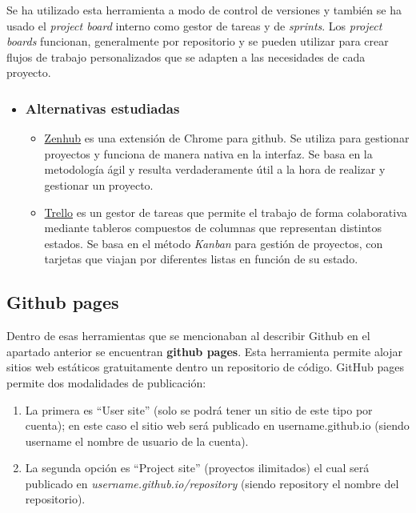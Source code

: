Se ha utilizado esta herramienta a modo de control de versiones y también se ha usado el \textit{project board} interno como gestor de tareas y de \textit{sprints}. Los \textit{project boards} funcionan, generalmente por repositorio y se pueden utilizar para crear flujos de trabajo personalizados que se adapten a las necesidades de cada proyecto.

\begin{itemize}
	\item \subsubsection{Alternativas estudiadas}
	\begin{itemize}
		\item \href{https://www.zenhub.io/}{Zenhub} es una extensión de Chrome para github. Se utiliza para gestionar proyectos y funciona de manera nativa en la interfaz. Se basa en la metodología ágil y resulta verdaderamente útil a la hora de realizar y gestionar un proyecto.
		\item \href{https://www.trello.com/}{Trello} es un gestor de tareas que permite el trabajo de forma colaborativa mediante tableros compuestos de columnas  que representan distintos estados. Se basa en el método \textit{Kanban} para gestión de proyectos, con tarjetas que viajan por diferentes listas en función de su estado. 
	\end{itemize}
\end{itemize}

\subsection{Github pages}
Dentro de esas herramientas que se mencionaban al describir Github en el apartado anterior se encuentran \textbf{github pages}. Esta herramienta permite alojar sitios web estáticos gratuitamente dentro un repositorio de código. GitHub pages permite dos modalidades de publicación:
\begin{enumerate}
	\item La primera es “User site” (solo se podrá tener un sitio de este tipo por cuenta); en este caso el sitio web será publicado en username.github.io (siendo username el nombre de usuario de la cuenta).
	\item La segunda opción es “Project site” (proyectos ilimitados) el cual será publicado en \textit{username.github.io/repository} (siendo repository el nombre del repositorio).
\end{enumerate}

